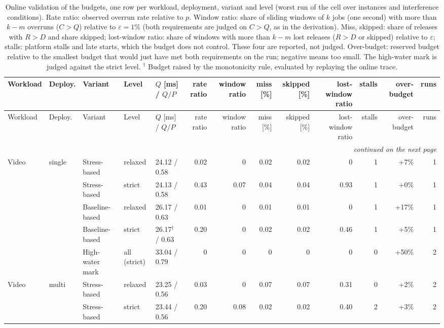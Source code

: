 \begin{longtable}{lllllrrrrrrrr}
\caption{Online validation of the budgets, one row per workload, deployment, variant and level (worst run of the cell over instances and interference conditions). Rate ratio: observed overrun rate relative to $p$. Window ratio: share of sliding windows of $k$ jobs (one second) with more than $k-m$ overruns ($C>Q$) relative to $\varepsilon=1\%$ (both requirements are judged on $C>Q$, as in the derivation). Miss, skipped: share of releases with $R>D$ and share skipped; lost-window ratio: share of windows with more than $k-m$ lost releases ($R>D$ or skipped) relative to $\varepsilon$; stalls: platform stalls and late starts, which the budget does not control. These four are reported, not judged. Over-budget: reserved budget relative to the smallest budget that would just have met both requirements on the run; negative means too small. The high-water mark is judged against the strict level. $^\dagger$ Budget raised by the monotonicity rule, evaluated by replaying the online trace.} \label{tab:rq2-validation-full} \\
\toprule
Workload & Deploy. & Variant & Level & $Q$ [ms] / $Q/P$ & rate ratio & window ratio & miss [\%] & skipped [\%] & lost-window ratio & stalls & over-budget & runs \\
\midrule
\endfirsthead
\toprule
Workload & Deploy. & Variant & Level & $Q$ [ms] / $Q/P$ & rate ratio & window ratio & miss [\%] & skipped [\%] & lost-window ratio & stalls & over-budget & runs \\
\midrule
\endhead
\midrule \multicolumn{13}{r}{\emph{continued on the next page}} \\ \endfoot
\bottomrule
\endlastfoot
Video & single & Stress-based & relaxed & 24.12 / 0.58 & 0.02 & 0 & 0.02 & 0.02 & 0 & 1 & +7\% & 1 \\
 &  & Stress-based & strict & 24.13 / 0.58 & 0.43 & 0.07 & 0.04 & 0.04 & 0.93 & 1 & +0\% & 1 \\
 &  & Baseline-based & relaxed & 26.17 / 0.63 & 0.01 & 0 & 0.01 & 0.01 & 0 & 1 & +17\% & 1 \\
 &  & Baseline-based & strict & 26.17$^\dagger$ / 0.63 & 0.20 & 0 & 0.02 & 0.02 & 0.46 & 1 & +5\% & 1 \\
 &  & High-water mark & all (strict) & 33.04 / 0.79 & 0 & 0 & 0 & 0 & 0 & 0 & +50\% & 2 \\
\midrule
Video & multi & Stress-based & relaxed & 23.25 / 0.56 & 0.03 & 0 & 0.07 & 0.07 & 0.31 & 0 & +2\% & 2 \\
 &  & Stress-based & strict & 23.44 / 0.56 & 0.20 & 0.08 & 0.02 & 0.02 & 0.40 & 2 & +3\% & 2 \\

\end{longtable}
